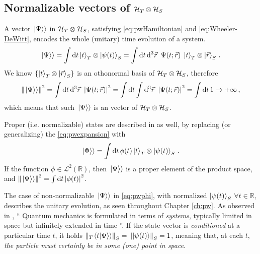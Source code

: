 \subsection{Normalizable vectors of $\mathcal{H}_T \otimes \mathcal{H}_S$}
\label{sec:properpw}

A vector $\left.\left| \Psi \right\rangle\right\rangle$ in $\mathcal{H}_T \otimes \mathcal{H}_S$,
satisfying \eqref{eq:pwHamiltonian} and \eqref{eq:Wheeler-DeWitt},
encodes the whole (unitary) time evolution of a system.
\begin{equation}\label{eq:pwexpansion}
  \left.\left| \Psi \right\rangle\right\rangle =
    \int \dd{t} \ket{t}_T \otimes \ket{\psi(t)}_S =
    \int \dd{t}\dd[3]{\vec{r}} \ \Psi(t; \vec{r}) \; \ket{t}_T \otimes \ket{\vec{r}}_S
    \,  \text{.}
\end{equation}
We know $\left\{\ket{t}_T \otimes \ket{\vec{r}}_S\right\}$ is an othonormal basis of $\mathcal{H}_T \otimes \mathcal{H}_S$, therefore
\begin{equation}
  \norm{\left.\left| \Psi \right\rangle\right\rangle}^2 =
    \int \dd{t}\dd[3]{\vec{r}} \ \abs{\Psi(t; \vec{r})}^2 =
    \int \dd{t} \int \dd[3]{\vec{r}} \ \abs{\Psi(t; \vec{r})}^2 =
    \int \dd{t} 1 \rightarrow +\infty
    \,  \text{,}
\end{equation}
which means that such $\left.\left| \Psi \right\rangle\right\rangle$ is an  vector of $\mathcal{H}_T \otimes \mathcal{H}_S$.

Proper (i.e. normalizable) states are described in \cite{Lloyd:Time} as well, by replacing (or generalizing)
the \eqref{eq:pwexpansion} with
\begin{equation}\label{eq:pwphi}
  \left.\left| \Phi \right\rangle\right\rangle =
    \int \dd{t} \phi(t) \ket{t}_T \otimes \ket{\psi(t)}_S \, \text{.}
\end{equation}
If the function $\phi \in \mathscr{L}^2(\mathbb{R})$,
then $\left.\left| \Psi \right\rangle\right\rangle$ is a proper element of the product space,
and $\norm{\left.\left| \Psi \right\rangle\right\rangle}^2 = \int \dd{t} \abs{\phi(t)}^2$.

The case of non-normalizable $\left.\left| \Psi \right\rangle\right\rangle$ in \eqref{eq:pwphi},
with normalized $\ket{\psi(t)}_S$ $\forall t \in \mathbb{R}$,
describes the unitary evolution, as seen throughout Chapter \ref{ch:pw}.
As observed in \cite{Maccone:QGR},
``%
  Quantum mechanics is formulated in terms of \emph{systems},
  typically limited in space but infinitely extended in time%
''.
If the state vector is \emph{conditioned} at a particular time $t$,
it holds $\norm{_{T}\!\left.\left\langle t \middle| \Psi \right\rangle\right\rangle}_S = \norm{\ket{\psi(t)}}_S = 1$,
meaning that, at each $t$,
\emph{the particle must certainly be in some (one) point in space}.


